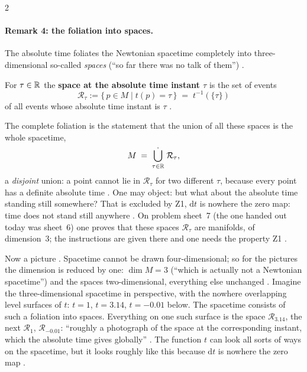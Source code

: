 \begin{paracol}{2}
\paragraph{Remark 4: the foliation into spaces.} The absolute time foliates the Newtonian spacetime completely into three-dimensional so-called \emph{spaces}
(``so far there was no talk of them'') .
\begin{definition}\label{def:nk-space}
For $\tau\in\mathbb{R}$ the \textbf{space at the absolute time instant $\tau$} is the set of events
\[
  \mathcal R_\tau:=\{\,p\in M\mid t(p)=\tau\,\}\;=\;t^{-1}(\{\tau\})
\]
of all events whose absolute time instant is $\tau$ .
\end{definition}
The complete foliation is the statement that the union of all these spaces is the whole spacetime,
\begin{equation}\label{eq:nk-foliation}
  M\;=\;\dot{\bigcup_{\tau\in\mathbb{R}}}\;\mathcal R_\tau ,
\end{equation}
a \emph{disjoint} union: a point cannot lie in $\mathcal R_\tau$ for two different $\tau$, because every point has a definite absolute time . One may object: but what about the
absolute time standing still somewhere? That is excluded by Z1, $\mathrm dt$ is nowhere the zero map: time does not stand still anywhere .
On problem sheet~7 (the one handed out today was sheet~6) one proves that these spaces $\mathcal R_\tau$ are manifolds, of dimension~3; the instructions
are given there and one needs the property Z1 .

Now a picture . Spacetime cannot be drawn four-dimensional; so for the pictures the dimension is reduced by one: $\dim M=3$ (``which is actually not a
Newtonian spacetime'') and the spaces two-dimensional, everything else unchanged . Imagine the three-dimensional spacetime in perspective, with
the nowhere overlapping level surfaces of $t$: $t=1$, $t=3.14$, $t=-0.01$ below. The spacetime consists of such a foliation into spaces. Everything on one such surface is the space
$\mathcal R_{3.14}$, the next $\mathcal R_1$, $\mathcal R_{-0.01}$: ``roughly a photograph of the space at the corresponding instant, which the absolute time gives globally''
. The function $t$ can look all sorts of ways on the spacetime, but it looks roughly like this because $\mathrm dt$ is nowhere the zero map .


\end{paracol}
